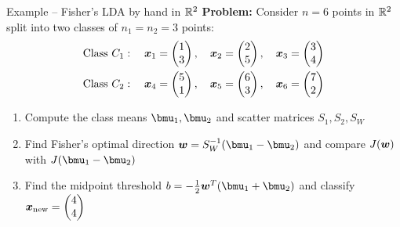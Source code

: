 \documentclass[aspectratio=169]{beamer}\usepackage[]{graphicx}\usepackage[]{xcolor}
\begin{document}

\begin{frame}{Example -- Fisher's LDA by hand in $\mathbb{R}^2$}
    \textbf{Problem:} Consider $n = 6$ points in $\mathbb{R}^2$ split into two classes of $n_1 = n_2 = 3$ points:
    \begin{align*}
        \text{Class } C_1: \quad \bm{x}_1 &= \begin{pmatrix} 1 \\ 3 \end{pmatrix}, \quad
        \bm{x}_2 = \begin{pmatrix} 2 \\ 5 \end{pmatrix}, \quad
        \bm{x}_3 = \begin{pmatrix} 3 \\ 4 \end{pmatrix} \\
        \text{Class } C_2: \quad \bm{x}_4 &= \begin{pmatrix} 5 \\ 1 \end{pmatrix}, \quad
        \bm{x}_5 = \begin{pmatrix} 6 \\ 3 \end{pmatrix}, \quad
        \bm{x}_6 = \begin{pmatrix} 7 \\ 2 \end{pmatrix}
    \end{align*}
    \begin{enumerate}
        \item Compute the class means $\bmu_1, \bmu_2$ and scatter matrices $S_1, S_2, S_W$
        \item Find Fisher's optimal direction $\bw = S_W^{-1}(\bmu_1 - \bmu_2)$ and compare $J(\bm{w})$ with $J(\bmu_1 - \bmu_2)$
        \item Find the midpoint threshold $b = -\frac{1}{2}\bw^T(\bmu_1 + \bmu_2)$ and classify $\bm{x}_{\text{new}} = \begin{pmatrix} 4 \\ 4 \end{pmatrix}$
    \end{enumerate}
\end{frame}
\end{document}
